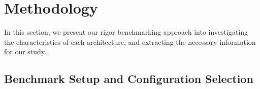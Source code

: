 \section{Methodology}\label{sec:methods}
%
In this section, we present our rigor benchmarking approach into investigating the characteristics of each architecture, and extracting the necessary information for our study.
%

\subsection{Benchmark Setup and Configuration Selection}\label{ssec:bmconf}

